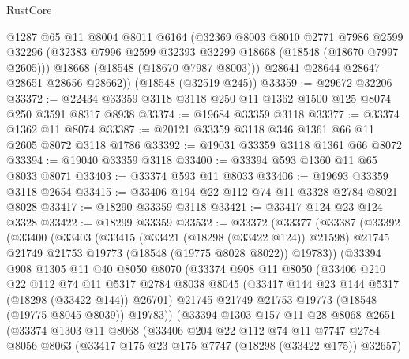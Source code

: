 \begin{lexlean}{RustCore}
\begin{coremodule}
        @1287
        @65
        @11
        @8004
        @8011
        @6164
        (@32369
          @8003
          @8010
          @2771
          @7986
          @2599
          @32296
          (@32383 @7996 @2599 @32393 @32299 @18668 (@18548 (@18670 @7997 @2605)))
          @18668
          (@18548 (@18670 @7987 @8003)))
        @28641
        @28644
        @28647
        @28651
        @28656
        @28662))
    (@18548 (@32519 @245))
@33359 := @29672 @32206
@33372 := @22434 @33359 @3118 @3118 @250 @11 @1362 @1500 @125 @8074 @250 @3591 @8317 @8938
@33374 := @19684 @33359 @3118
@33377 := @33374 @1362 @11 @8074
@33387 := @20121 @33359 @3118 @346 @1361 @66 @11 @2605 @8072 @3118 @1786
@33392 := @19031 @33359 @3118 @1361 @66 @8072
@33394 := @19040 @33359 @3118
@33400 := @33394 @593 @1360 @11 @65 @8033 @8071
@33403 := @33374 @593 @11 @8033
@33406 := @19693 @33359 @3118 @2654
@33415 := @33406 @194 @22 @112 @74 @11 @3328 @2784 @8021 @8028
@33417 := @18290 @33359 @3118
@33421 := @33417 @124 @23 @124 @3328
@33422 := @18299 @33359
@33532 := @33372
    (@33377
      (@33387
        (@33392
          (@33400
            (@33403
              (@33415
                (@33421 (@18298 (@33422 @124)) @21598)
                @21745
                @21749
                @21753
                @19773
                (@18548 (@19775 @8028 @8022))
                @19783))
            (@33394
              @908
              @1305
              @11
              @40
              @8050
              @8070
              (@33374
                @908
                @11
                @8050
                (@33406
                  @210
                  @22
                  @112
                  @74
                  @11
                  @5317
                  @2784
                  @8038
                  @8045
                  (@33417 @144 @23 @144 @5317 (@18298 (@33422 @144)) @26701)
                  @21745
                  @21749
                  @21753
                  @19773
                  (@18548 (@19775 @8045 @8039))
                  @19783))
              (@33394
                @1303
                @157
                @11
                @28
                @8068
                @2651
                (@33374
                  @1303
                  @11
                  @8068
                  (@33406
                    @204
                    @22
                    @112
                    @74
                    @11
                    @7747
                    @2784
                    @8056
                    @8063
                    (@33417 @175 @23 @175 @7747 (@18298 (@33422 @175)) @32657)

\end{coremodule}
\end{lexlean}
